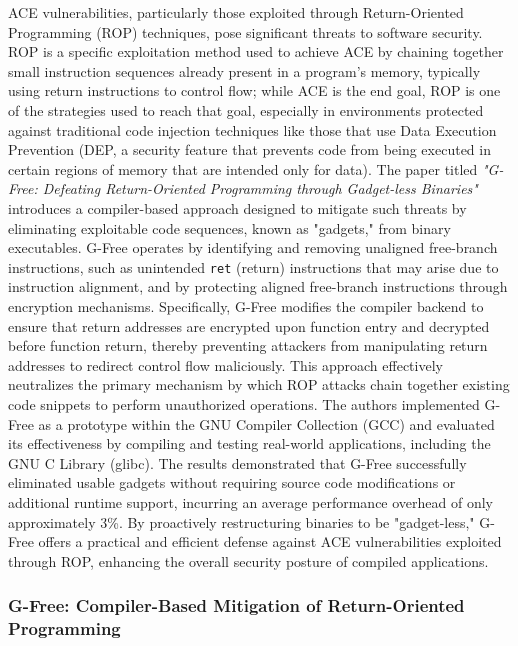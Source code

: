 \documentclass[a4paper]{usiinfbachelorproject}
\begin{document}
ACE vulnerabilities, particularly those exploited through Return-Oriented Programming (ROP) techniques, pose significant threats to software security. ROP is a specific exploitation method used to achieve ACE by chaining together small instruction sequences already present in a program’s memory, typically using return instructions to control flow; while ACE is the end goal, ROP is one of the strategies used to reach that goal, especially in environments protected against traditional code injection techniques like those that use Data Execution Prevention (DEP, a security feature that prevents code from being executed in certain regions of memory that are intended only for data). The paper titled \textit{"G-Free: Defeating Return-Oriented Programming through Gadget-less Binaries"}\cite{onarlioglu2010gfree} introduces a compiler-based approach designed to mitigate such threats by eliminating exploitable code sequences, known as "gadgets," from binary executables. G-Free operates by identifying and removing unaligned free-branch instructions, such as unintended \texttt{ret} (return) instructions that may arise due to instruction alignment, and by protecting aligned free-branch instructions through encryption mechanisms. Specifically, G-Free modifies the compiler backend to ensure that return addresses are encrypted upon function entry and decrypted before function return, thereby preventing attackers from manipulating return addresses to redirect control flow maliciously. This approach effectively neutralizes the primary mechanism by which ROP attacks chain together existing code snippets to perform unauthorized operations. The authors implemented G-Free as a prototype within the GNU Compiler Collection (GCC) and evaluated its effectiveness by compiling and testing real-world applications, including the GNU C Library (glibc). The results demonstrated that G-Free successfully eliminated usable gadgets without requiring source code modifications or additional runtime support, incurring an average performance overhead of only approximately 3\%. By proactively restructuring binaries to be "gadget-less," G-Free offers a practical and efficient defense against ACE vulnerabilities exploited through ROP, enhancing the overall security posture of compiled applications.

\subsubsection{G-Free: Compiler-Based Mitigation of Return-Oriented Programming}
\end{document}
